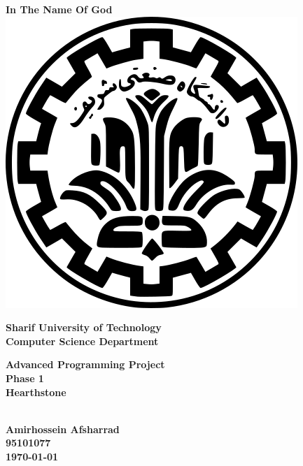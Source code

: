 \documentclass[a4paper]{article}
\begin{document}
	
\begin{titlepage}
	
	\begin{center}
		\textbf{
			In The Name Of God\\
		}
		\vspace{2cm}
		\includegraphics[scale=0.25]{logo.png}\\
		\vspace{0.5cm}
		\begin{Large}
			\textbf{
				Sharif University of Technology\\
				\vspace{0.5cm}
				Computer Science Department\\
			}
		\end{Large}
		\vspace{2.5cm}
		\begin{huge}
			\textbf{
				Advanced Programming Project\\
				 Phase 1\\
				\vspace{1cm}
				Hearthstone\\
			}
		\end{huge}
		\vspace{1.5cm}
		\begin{Large}
			\textbf{
				\\
				\vspace{1cm}
				Amirhossein Afsharrad\\
				\vspace{0.5cm}
				95101077\\
				\vspace{2cm}
				\today
			}
		\end{Large}
		
	\end{center}
	
	\thispagestyle{empty}
\end{titlepage}	
\end{document}
